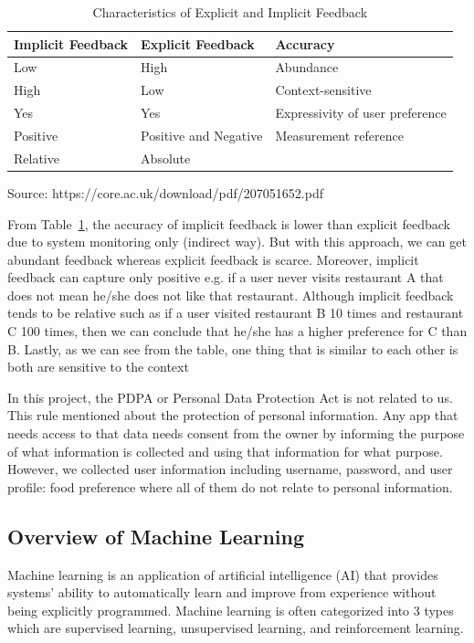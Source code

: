 \documentclass[12pt,oneside,openright,a4paper]{cpe-english-project}
\begin{document}
\begin{table}[H]
\caption{Characteristics of Explicit and Implicit Feedback}\label{tbl:2CharacteristicsofExplicitandImplicitFeedback}
\begin{tabular}{l|l|l} \hline\hline
Implicit Feedback & Explicit Feedback & Accuracy \\ \hline\hline
Low & High & Abundance \\ \hline
High & Low & Context-sensitive \\ \hline
Yes & Yes & Expressivity of user preference \\ \hline
Positive & Positive and Negative & Measurement reference \\ \hline
Relative & Absolute \\ \hline\hline
\end{tabular}\par
\smallskip
Source: https://core.ac.uk/download/pdf/207051652.pdf
\end{table}


From Table~\ref{tbl:2CharacteristicsofExplicitandImplicitFeedback}, the accuracy of implicit feedback is lower than explicit feedback due to system monitoring only (indirect way). But with this approach, we can get abundant feedback whereas explicit feedback is scarce. Moreover, implicit feedback can capture only positive e.g. if a user never visits restaurant A that does not mean he/she does not like that restaurant. Although implicit feedback tends to be relative such as if a user visited restaurant B 10 times and restaurant C 100 times, then we can conclude that he/she has a higher preference for C than B. Lastly, as we can see from the table, one thing that is similar to each other is both are sensitive to the context


In this project, the PDPA or Personal Data Protection Act is not related to us. This rule mentioned about the protection of personal information. Any app that needs access to that data needs consent from the owner by informing the purpose of what information is collected and using that information for what purpose. However, we collected user information including username, password, and user profile: food preference where all of them do not relate to personal information.

\subsection{Overview of Machine Learning}

Machine learning is an application of artificial intelligence (AI) that provides systems’ ability to automatically learn and improve from experience without being explicitly programmed. \cite{WhatisMachineLearning} Machine learning is often categorized into 3 types which are supervised learning, unsupervised learning, and reinforcement learning.
\end{document}
